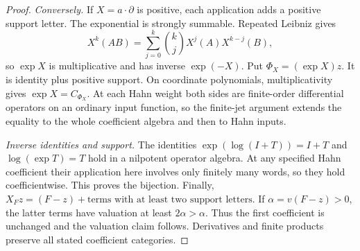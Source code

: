 \documentclass[11pt,letterpaper]{article}
\theoremstyle{definition}
\theoremstyle{remark}
\numberwithin{equation}{section}
\begin{document}
\begin{proof}
\emph{Conversely.} If $X=a\cdot\partial$ is positive, each application adds
a positive support letter. The exponential is strongly summable. Repeated
Leibniz gives
\[
 X^k(AB)=\sum_{j=0}^k\binom{k}{j}X^j(A)X^{k-j}(B),
\]
so $\exp X$ is multiplicative and has inverse $\exp(-X)$. Put
$\Phi_X=(\exp X)z$. It is identity plus positive support. On coordinate
polynomials, multiplicativity gives $\exp X=C_{\Phi_X}$. At each Hahn
weight both sides are finite-order differential operators on an ordinary
input function, so the finite-jet argument extends the equality to the
whole coefficient algebra and then to Hahn inputs.

\emph{Inverse identities and support.} The identities
$\exp(\log(I+T))=I+T$ and $\log(\exp T)=T$ hold in a nilpotent operator
algebra. At any specified Hahn coefficient their application here involves
only finitely many words, so they hold coefficientwise. This proves the
bijection. Finally, $X_Fz=(F-z)+\text{terms with at least two support
letters}$. If $\alpha=v(F-z)>0$, the latter terms have valuation at least
$2\alpha>\alpha$. Thus the first coefficient is unchanged and the valuation
claim follows. Derivatives and finite products preserve all stated
coefficient categories.
\end{proof}
\end{document}
